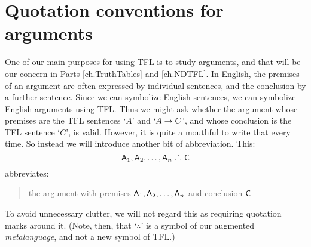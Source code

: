 

\section{Quotation conventions for arguments}

One of our main purposes for using TFL is to study arguments, and that will be our concern in Parts \ref{ch.TruthTables} and \ref{ch.NDTFL}. In English, the premises of an argument are often expressed by individual sentences, and the conclusion by a further sentence. Since we can symbolize English sentences, we can symbolize English arguments using TFL. Thus we might ask whether the argument whose premises are the TFL sentences `$A$' and `$A \rightarrow C$', and whose conclusion is the TFL sentence `$C$', is valid. However, it is quite a mouthful to write that every time. So instead we will introduce another bit of abbreviation. This:
	$$\mathsf{A}_1, \mathsf{A}_2, \ldots, \mathsf{A}_n \mathrel{\ldotp\dot{}\,\ldotp} \mathsf{C}$$
abbreviates:
	\begin{quote}
		the argument with premises $\mathsf{A}_1, \mathsf{A}_2, \ldots, \mathsf{A}_n$ and conclusion $\mathsf{C}$
	\end{quote}
To avoid unnecessary clutter, we will not regard this as requiring quotation marks around it. (Note, then, that `$\therefore$' is a symbol of our augmented \emph{metalanguage}, and not a new symbol of TFL.)
